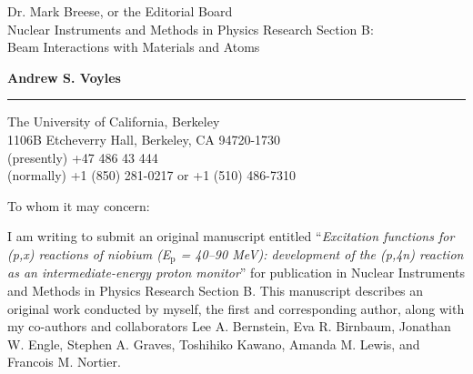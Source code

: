 \documentclass{letter} %
\begin{document}
\signature{Andrew S. Voyles}           %
\longindentation=0pt                       %
\let\raggedleft\raggedright                %
 
 
\begin{letter}{Dr. Mark Breese, or the Editorial Board \\
Nuclear Instruments and Methods in Physics Research Section B: \\
Beam Interactions with Materials and Atoms}


\begin{flushleft}
{\large\bf Andrew S. Voyles}
\end{flushleft}
\medskip\hrule height 1pt
\begin{flushright}
\hfill The University of California, Berkeley \\
\hfill 1106B Etcheverry Hall, Berkeley, CA  94720-1730 \\
\hfill (presently) +47 486 43 444 \\ 
\hfill (normally) +1 (850) 281-0217 or +1 (510) 486-7310 
\end{flushright} 
\vfill %

 
\opening{To whom it may concern:} 

  \renewcommand*{\thefootnote}{\alph{footnote}}


  
\noindent I am writing to submit an original manuscript entitled \enquote{\emph{Excitation functions for (p,x) reactions of niobium (E$_{\text{p}}$ = 40--90 MeV):  development of the (p,4n) reaction as an intermediate-energy proton monitor}}  for publication in Nuclear Instruments and Methods in Physics Research Section B.  This manuscript describes an original work conducted by myself, the first and corresponding author, along with my co-authors and collaborators Lee A. Bernstein\footnotemark[1]\footnotemark[2], Eva R. Birnbaum\footnotemark[3], Jonathan W. Engle\footnotemark[4], Stephen A. Graves\footnotemark[5], Toshihiko Kawano\footnotemark[6], Amanda M. Lewis\footnotemark[2], and Francois M. Nortier\footnotemark[3].



\end{letter}
\end{document}
